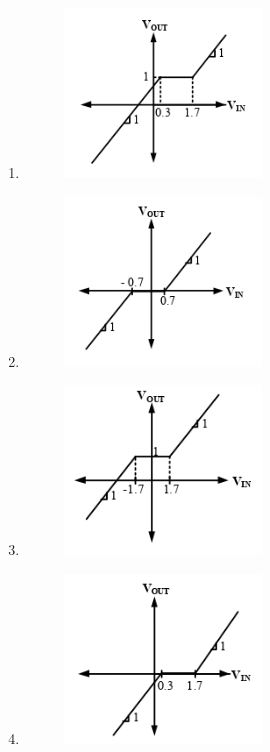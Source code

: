 \documentclass[a4paper, 11pt]{article}
\begin{document}
\begin{enumerate}
    \begin{enumerate}
        \item \begin{figure}[H] \centering \includegraphics[width=0.4\columnwidth]{figs/Q30A.png} \caption*{} \label{fig:q40a} \end{figure}
        \item \begin{figure}[H] \centering \includegraphics[width=0.4\columnwidth]{figs/Q30B.png} \caption*{} \label{fig:q40b} \end{figure}
        \item \begin{figure}[H] \centering \includegraphics[width=0.4\columnwidth]{figs/Q30C.png} \caption*{} \label{fig:q40c} \end{figure}
        \item \begin{figure}[H] \centering \includegraphics[width=0.4\columnwidth]{figs/Q30D.png} \caption*{} \label{fig:q40d} \end{figure}
    \end{enumerate}


\end{enumerate}
\end{document}
